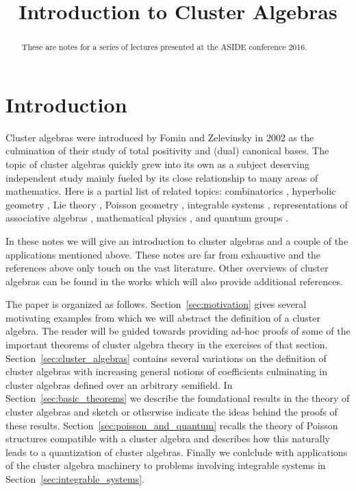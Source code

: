 \documentclass{amsart}
\title{Introduction to Cluster Algebras}
\theoremstyle{definition}
\theoremstyle{remark}
\numberwithin{equation}{section}
\begin{document}
\begin{abstract}
  These are notes for a series of lectures presented at the ASIDE conference 2016.
\end{abstract}
\maketitle

\section{Introduction}
  Cluster algebras were introduced by Fomin and Zelevinsky \cite{FZ02} in 2002 as the culmination of their study of total positivity \cite{FZ00} and (dual) canonical bases.  The topic of cluster algebras quickly grew into its own as a subject deserving independent study mainly fueled by its close relationship to many areas of mathematics.  Here is a partial list of related topics: combinatorics \cite{MP07}, hyperbolic geometry \cite{FG06,FST08,MSW13}, Lie theory \cite{GLS06}, Poisson geometry \cite{GSV03}, integrable systems \cite{dFK10,G11}, representations of associative algebras \cite{CC,CK,BMRRT,Rup1,Q,Rup2}, mathematical physics \cite{EF,ABCGPT}, and quantum groups \cite{K,GLS2,KQ,BR}.

  In these notes we will give an introduction to cluster algebras and a couple of the applications mentioned above.  These notes are far from exhaustive and the references above only touch on the vast literature.  Other overviews of cluster algebras can be found in the works \cite{??} which will also provide additional references.

  The paper is organized as follows.  Section~\ref{sec:motivation} gives several motivating examples from which we will abstract the definition of a cluster algebra.  The reader will be guided towards providing ad-hoc proofs of some of the important theorems of cluster algebra theory in the exercises of that section.  Section~\ref{sec:cluster_algebras} contains several variations on the definition of cluster algebras with increasing general notions of coefficients culminating in cluster algebras defined over an arbitrary semifield.  In Section~\ref{sec:basic_theorems} we describe the foundational results in the theory of cluster algebras and sketch or otherwise indicate the ideas behind the proofs of these results. Section~\ref{sec:poisson_and_quantum} recalls the theory of Poisson structures compatible with a cluster algebra and describes how this naturally leads to a quantization of cluster algebras.  Finally we conlclude with applications of the cluster algebra machinery to problems involving integrable systems in Section~\ref{sec:integrable_systems}.
\end{document}
